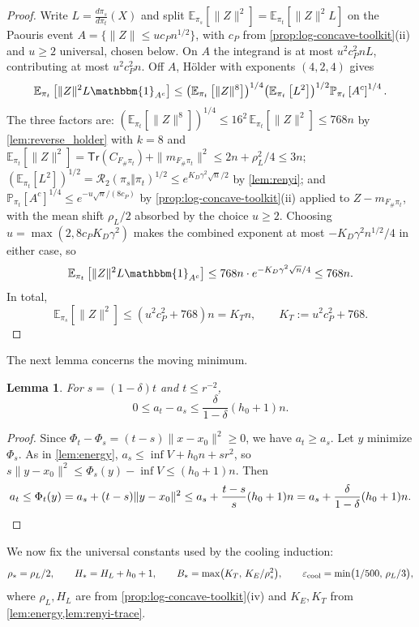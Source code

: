 \documentclass[11pt]{article}
\numberwithin{equation}{section}
\newtheorem{lemma}{Lemma}[section]
\theoremstyle{definition}
\newcommand{\eps}{\varepsilon}
\newcommand{\E}[2]{\mathbb{E}_{#1}\left[#2\right]}
\renewcommand{\P}[2]{\mathbb{P}_{#1}\left[#2\right]}
\newcommand{\Tr}[1]{\mathsf{Tr}\left(#1\right)}
\newcommand{\ind}{\mathbbm{1}}
\begin{document}
\begin{proof}
Write $L=\frac{d\pi_s}{d\pi_t}(X)$ and split
$\E{\pi_s}{\|Z\|^2}=\E{\pi_t}{\|Z\|^2L}$ on the Paouris event
$A=\{\|Z\|\leq uc_Pn^{1/2}\}$, with
$c_P$ from \cref{prop:log-concave-toolkit}(ii) and
$u\geq2$ universal, chosen below.
On $A$ the integrand is at most
$u^2c_P^2nL$, contributing at most
$u^2c_P^2n$.
Off $A$, H\"older with exponents
$(4,2,4)$ gives
\[
 \E{\pi_t}{\|Z\|^2L\ind_{A^c}}
 \leq\bigl(\E{\pi_t}{\|Z\|^8}\bigr)^{1/4}
     \bigl(\E{\pi_t}{L^2}\bigr)^{1/2}
     \P{\pi_t}{A^c}^{1/4}.
\]
The three factors are:
$(\E{\pi_t}{\|Z\|^8})^{1/4} \leq16^2\,\E{\pi_t}{\|Z\|^2}\leq768n$ by
\cref{lem:reverse_holder} with
$k=8$ and
$\E{\pi_t}{\|Z\|^2}=\Tr{C_{F_\#\pi_t}}+\|m_{F_\#\pi_t}\|^2 \leq2n+\rho_L^2/4\leq3n$;
$(\E{\pi_t}{L^2})^{1/2} =\mathcal R_2(\pi_s\Vert\pi_t)^{1/2} \leq e^{K_D\gamma^2\sqrt n/2}$
by \cref{lem:renyi}; and
$\P{\pi_t}{A^c}^{1/4}\leq e^{-u\sqrt n/(8c_P)}$ by
\cref{prop:log-concave-toolkit}(ii) applied to
$Z-m_{F_\#\pi_t}$, with the mean shift
$\rho_L/2$ absorbed by the choice
$u\geq2$.
Choosing $u=\max(2,8c_PK_D\gamma^2)$ makes the combined exponent at most
$-K_D\gamma^2n^{1/2}/4$ in either case, so
\[
\E{\pi_t}{\|Z\|^2L\ind_{A^c}}
\leq768n\cdot e^{-K_D\gamma^2\sqrt n/4}
\leq768n.
\]
In total,
\[
\E{\pi_s}{\|Z\|^2}\leq (u^2c_P^2+768)n=K_Tn,
\qquad K_T:=u^2c_P^2+768.
\]
\end{proof}

The next lemma concerns the moving minimum.

\begin{lemma}
\label{lem:moving-min}
For $s=(1-\delta)t$ and
$t\leq r^{-2}$,
\[
0
\leq a_t-a_s
\leq\frac{\delta}{1-\delta}(h_0+1)n .
\]
\end{lemma}

\begin{proof}
Since $\Phi_t-\Phi_s=(t-s)\|x-x_0\|^2\geq0$, we have
$a_t\geq a_s$.
Let $y$ minimize
$\Phi_s$.
As in \cref{lem:energy}, $a_s\leq\inf V+h_0n+sr^2$, so
$s\|y-x_0\|^2\leq\Phi_s(y)-\inf V\leq(h_0+1)n$.
Then
\[
a_t
\leq\Phi_t(y)
=a_s+(t-s)\|y-x_0\|^2
\leq a_s+\frac{t-s}{s}(h_0+1)n
=a_s+\frac{\delta}{1-\delta}(h_0+1)n .\qedhere
\]
\end{proof}

We now fix the universal constants used by the cooling induction:
\[
\rho_*=\rho_L/2,
\qquad
H_*=H_L+h_0+1,
\qquad
B_*=\max\bigl(K_T,\,K_E/\rho_*^2\bigr),
\qquad
\eps_{\rm cool}=\min\bigl(1/500,\,\rho_L/3\bigr),
\]
where $\rho_L,H_L$ are from \cref{prop:log-concave-toolkit}(iv) and
$K_E,K_T$ from \cref{lem:energy,lem:renyi-trace}.
\end{document}
